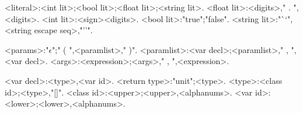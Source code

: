 \begin{grammar}
<literal>:<int lit>;<bool lit>;<float lit>;<string lit>.
<float lit>:<digits>," . ",<digits>.
<int lit>:<sign><digits>.
<bool lit>:"true";"false".
<string lit>:"``",<string escape seq>,"''".

<params>:"$\epsilon$";" ( ",<paramlist>," )".
<paramlist>:<var decl>;<paramlist>," , ",<var decl>.
<args>:<expression>;<args>," , ",<expression>.

<var decl>:<type>,<var id>.
<return type>:"unit";<type>.
<type>:<class id>;<type>,"[]".
<class id>:<upper>;<upper>,<alphanums>.
<var id>:<lower>;<lower>,<alphanums>.

\end{grammar}
